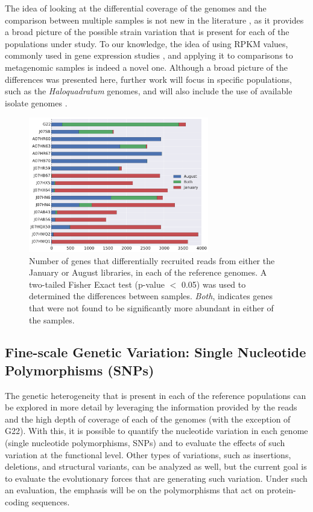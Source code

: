 The idea of looking at the differential coverage of the genomes and the  comparison between multiple samples is not new in the literature \cite{DyallSmith:2011tu,Pasic:2009bo}, as it provides a broad picture of the possible strain variation that is present for each of the populations under study. To our knowledge, the idea of using RPKM values, commonly used in gene expression studies \cite{Mortazavi:2008jj}, and applying it to comparisons to metagenomic samples is indeed a novel one. Although a broad picture of the differences was presented here, further work will focus in specific populations, such as the \textit{Haloquadratum} genomes, and will also include the use of available isolate genomes \cite{DyallSmith:2011tu}.

\begin{figure}[!hbtp]
  \centering
  \includegraphics[width=0.7\textwidth]{Chapter5/Figures/GeneDifferencesSeason.pdf}
  \caption{Number of genes that differentially recruited reads from either the January or August libraries, in each of the reference genomes. A two-tailed Fisher Exact test (p-value $<$ 0.05) was used to determined the differences between samples. \textit{Both}, indicates genes that were not found to be significantly more abundant in either of the samples.} 
  \label{CoverageGenes}
\end{figure}

\clearpage
\subsection{Fine-scale Genetic Variation: Single Nucleotide Polymorphisms (SNPs)}

The genetic heterogeneity that is present in each of the reference populations can be explored in more detail by leveraging the information provided by the reads and the high depth of coverage of each of the genomes (with the exception of G22). With this, it is possible to quantify the nucleotide variation in each genome (single nucleotide polymorphisms, SNPs) and to evaluate the effects of such variation at the functional level. Other types of variations, such as insertions, deletions, and structural variants, can be analyzed as well, but the current goal is to evaluate the evolutionary forces that are generating such variation. Under such an evaluation, the emphasis will be on the polymorphisms that act on protein-coding sequences.


